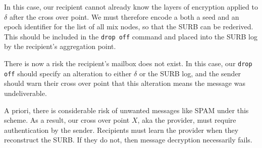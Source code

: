In this case, our recipient cannot already know the layers of
encryption applied to $\delta$ after the cross over point.  
We must therefore encode a both a seed and an epoch identifier for
the list of all mix nodes, so that the SURB can be rederived.
This should be included in the {\tt drop off} command and placed into
the SURB log by the recipient's aggregation point.

There is now a risk the recipient's mailbox does not exist. 
In this case, our {\tt drop off} should specify an alteration to
either $\delta$ or the SURB log, and the sender should warn their
cross over point that this alteration means the message was undeliverable.

A priori, there is considerable risk of unwanted messages like SPAM
under this scheme.  As a result, our cross over point $X$, aka the
provider, must require authentication by the sender.  
Recipients must learn the provider when they reconstruct the SURB.  
If they do not, then message decryption necessarily fails.



